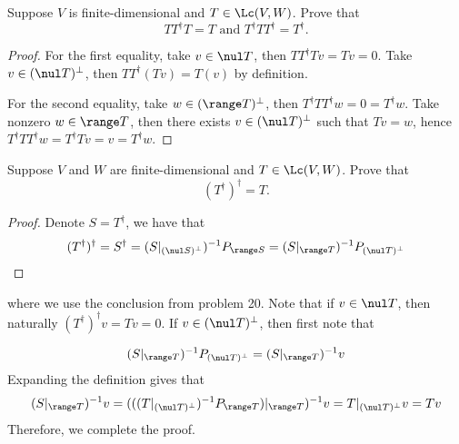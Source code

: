 \documentclass{extarticle}
\begin{document}
\begin{problem}{22}
    Suppose \(V\) is finite-dimensional and \(T \in \Lc(V, W)\). Prove that 
    \[TT^\dagger T = T \text{  and  } T^\dagger T T^\dagger = T^\dagger.\]
\end{problem}

\begin{proof}
For the first equality, take \(v \in \nul T\), then \(TT^\dagger T v = Tv = 0\). Take \(v \in (\nul T)^\perp\), 
then \(TT^\dagger (Tv) = T(v)\) by definition. 

For the second equality, take \(w \in (\range T)^\perp\), then \(T^\dagger T T^\dagger w = 0 = T^\dagger w\). 
Take nonzero \(w \in \range T\), then there exists \(v \in (\nul T)^\perp\) such that \(Tv = w\), hence 
\(T^\dagger T T^\dagger w = T^\dagger Tv = v = T^\dagger w\). 
\end{proof}

\begin{problem}{23}
    Suppose \(V\) and \(W\) are finite-dimensional and \(T \in \Lc(V, W)\). Prove that 
    \[(T^\dagger)^\dagger = T.\]
\end{problem}

\begin{proof}
Denote \(S = T^\dagger\), we have that 
\[(T^\dagger)^\dagger = S^\dagger = (S|_{(\nul S)^\perp})^{-1} P_{\range S} 
= (S|_{\range T})^{-1} P_{(\nul T)^\perp}\]
\end{proof} 

where we use the conclusion from problem 20. Note that if \(v \in \nul T\), then naturally 
\((T^\dagger)^\dagger v = Tv = 0\). If \(v \in (\nul T)^{\perp}\), then first note that 

\[(S|_{\range T})^{-1} P_{(\nul T)^\perp} = (S|_{\range T})^{-1} v \] 
Expanding the definition gives that 
\[(S|_{\range T})^{-1}v = (((T|_{(\nul T)^\perp})^{-1} P_{\range T})|_{\range T})^{-1} v
= T|_{(\nul T)^\perp}v = Tv\]
Therefore, we complete the proof. 
\end{document}

